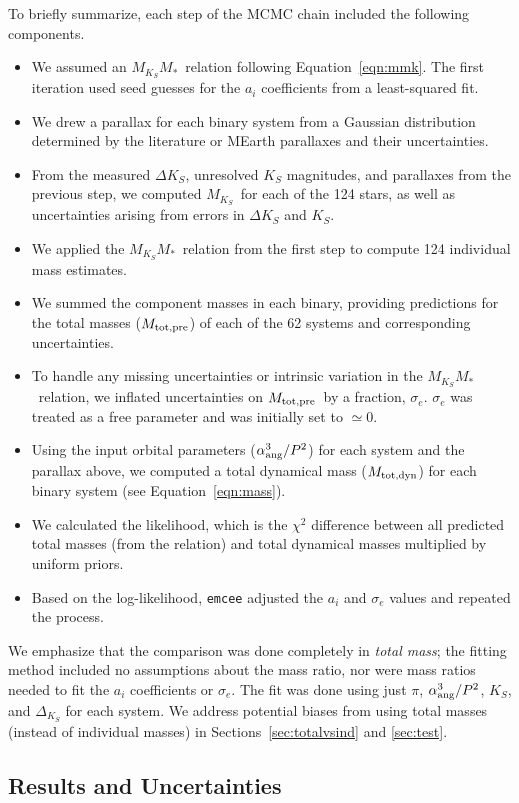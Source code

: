 \documentclass[twocolumn]{aastex62}
\newcommand{\mks}{$M_{K_S}$}
\newcommand{\mmk}{$M_{K_S}$\textendash$M_*$}
\newcommand{\mpred}{$M_{\rm{tot,pre}}$}
\newcommand{\mdyn}{$M_{\rm{tot,dyn}}$}
\begin{document}
To briefly summarize, each step of the MCMC chain included the following components. 
\begin{itemize}
\item We assumed an \mmk\ relation following Equation~\ref{eqn:mmk}. The first iteration used seed guesses for the $a_i$ coefficients from a least-squared fit. 
\item We drew a parallax for each binary system from a Gaussian distribution determined by the literature or MEarth parallaxes and their uncertainties.
\item From the measured $\Delta K_S$, unresolved $K_S$ magnitudes, and parallaxes from the previous step, we computed \mks\ for each of the 124 stars, as well as uncertainties arising from errors in $\Delta K_S$ and $K_S$.
\item We applied the \mmk\ relation from the first step to compute 124 individual mass estimates.
\item We summed the component masses in each binary, providing predictions for the total masses (\mpred) of each of the 62 systems and corresponding uncertainties.
\item To handle any missing uncertainties or intrinsic variation in the \mmk\ relation, we inflated uncertainties on \mpred\ by a fraction, $\sigma_e$. $\sigma_e$ was treated as a free parameter and was initially set to $\simeq$0. 
\item Using the input orbital parameters ($\alpha_{\rm{ang}}^3/P^2$) for each system and the parallax above, we computed a total dynamical mass (\mdyn) for each binary system (see Equation~\ref{eqn:mass}). 
\item We calculated the likelihood, which is the $\chi^2$ difference between all predicted total masses (from the relation) and total dynamical masses multiplied by uniform priors.
\item Based on the log-likelihood, {\tt emcee} adjusted the $a_i$ and $\sigma_e$ values and repeated the process.
\end{itemize}
We emphasize that the comparison was done completely in {\it total mass}; the fitting method included no assumptions about the mass ratio, nor were mass ratios needed to fit the $a_i$ coefficients or $\sigma_e$. The fit was done using just $\pi$, $\alpha_{\rm{ang}}^3/P^2$, $K_S$, and $\Delta_{K_S}$ for each system. We address potential biases from using total masses (instead of individual masses) in Sections~\ref{sec:totalvsind} and \ref{sec:test}.

\subsection{Results and Uncertainties}\label{sec:res}
\end{document}
